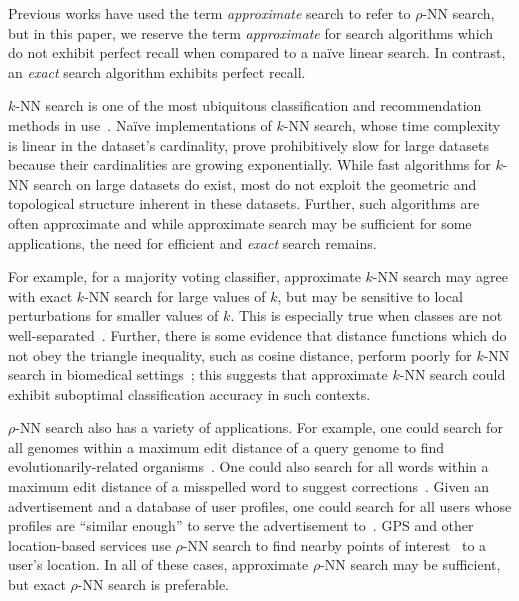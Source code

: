 Previous works have used the term \textit{approximate} search to refer to $\rho$-NN search, but in this paper, we reserve the term \textit{approximate} for search algorithms which do not exhibit perfect recall when compared to a na\"{i}ve linear search.
In contrast, an \textit{exact} search algorithm exhibits perfect recall.

$k$-NN search is one of the most ubiquitous classification and recommendation methods in use~\cite{fix1952discriminatory, cover1967nearest}.
Na\"{i}ve implementations of $k$-NN search, whose time complexity is linear in the dataset's cardinality, prove prohibitively slow for large datasets because their cardinalities are growing exponentially.
While fast algorithms for $k$-NN search on large datasets do exist, most do not exploit the geometric and topological structure inherent in these datasets.
Further, such algorithms are often approximate and while approximate search may be sufficient for some applications, the need for efficient and \textit{exact} search remains.

For example, for a majority voting classifier, approximate $k$-NN search may agree with exact $k$-NN search for large values of $k$, but may be sensitive to local perturbations for smaller values of $k$.
This is especially true when classes are not well-separated~\cite{zhang2022imbalanced}.
Further, there is some evidence that distance functions which do not obey the triangle inequality, such as cosine distance, perform poorly for $k$-NN search in biomedical settings~\cite{hu2016distance};
this suggests that approximate $k$-NN search could exhibit suboptimal classification accuracy in such contexts.

$\rho$-NN search also has a variety of applications.
For example, one could search for all genomes within a maximum edit distance of a query genome to find evolutionarily-related organisms~\cite{budowski2010fragbag}.
One could also search for all words within a maximum edit distance of a misspelled word to suggest corrections~\cite{ukkonen1985algorithms}.
Given an advertisement and a database of user profiles, one could search for all users whose profiles are ``similar enough'' to serve the advertisement to~\cite{zhang2020privacy}.
GPS and other location-based services use $\rho$-NN search to find nearby points of interest~\cite{zhang2020privacy} to a user's location.
In all of these cases, approximate $\rho$-NN search may be sufficient, but exact $\rho$-NN search is preferable.

